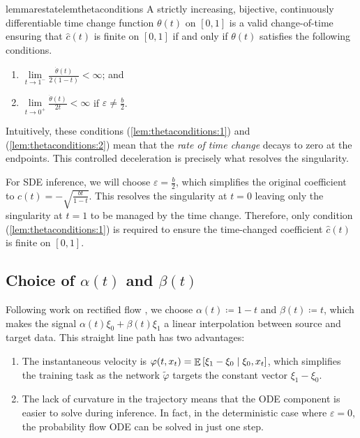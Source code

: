 \begin{theorembox}
  \begin{restatable}{lemma}{restatelemthetaconditions}\label{lem:thetaconditions}
    A strictly increasing, bijective, continuously differentiable time change function \(\theta(t)\) on \([0, 1]\) is a valid change-of-time ensuring that \(\hat{c}(t)\) is finite on \([0, 1]\) if and only if \(\theta(t)\) satisfies the following conditions.
    \begin{enumerate}
      \item\label{lem:thetaconditions:1} \(\lim\limits_{t \to 1^{-}} \frac{\dot{\theta}(t)}{2(1-t)} < \infty \); and
      \item\label{lem:thetaconditions:2} \(\lim\limits_{t \to 0^{+}} \frac{\dot{\theta}(t)}{2t} < \infty \) if \(\varepsilon \neq \frac{b}{2}\).
    \end{enumerate}
  \end{restatable}
\end{theorembox}
\begin{remarkbox}
  \begin{remark}
    Intuitively, these conditions (\ref{lem:thetaconditions:1}) and (\ref{lem:thetaconditions:2}) mean that the \textit{rate of time change} decays to zero at the endpoints. This controlled deceleration is precisely what resolves the singularity.
  \end{remark}
\end{remarkbox}
For SDE inference, we will choose \(\varepsilon = \frac{b}{2}\), which simplifies the original coefficient to \(c(t) = -\sqrt{\frac{bt}{1-t}}\). This resolves the singularity at \(t=0\) leaving only the singularity at  \(t=1\) to be  managed by the time change. Therefore, only condition (\ref{lem:thetaconditions:1}) is required to ensure the time-changed coefficient \(\hat{c}(t)\) is finite on \([0, 1]\).

\subsection{Choice of \(\alpha(t)\) and \(\beta(t)\)}
Following work on rectified flow \citep{liu2022flow}, we choose \(\alpha(t)  \coloneqq 1-t\) and \(\beta(t) \coloneqq t\), which makes the signal \(\alpha(t) \xi_{0} + \beta(t) \xi_{1}\) a linear interpolation between source and target data. This straight line path has two advantages:
\begin{enumerate}
  \item The instantaneous velocity is \(\varphi(t, x_{t}) = \mathop{\mathbb{E}}\qty[\xi_{1} - \xi_{0} \mid \xi_{0}, x_{t}]\), which simplifies the training task as the network \(\widetilde{\varphi}\) targets the constant vector \(\xi_{1} - \xi_{0}\).
  \item The lack of curvature in the trajectory means that the ODE component is easier to solve during inference. In fact, in the deterministic case where \(\varepsilon = 0\), the probability flow ODE can be solved in just one step.
\end{enumerate}

